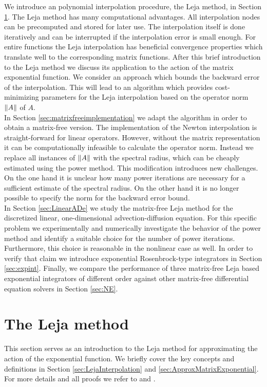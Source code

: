\documentclass{scrartcl}
\begin{document}
	We introduce an polynomial interpolation procedure, the Leja method, in Section \ref{sec:LejaMethod}. The Leja method has many computational advantages. All interpolation nodes can be precomputed and stored for later use. The interpolation itself is done iteratively and can be interrupted if the interpolation error is small enough. For entire functions the Leja interpolation has beneficial convergence properties which translate well to the corresponding matrix functions. After this brief introduction to the Leja method we discuss its application to the action of the matrix exponential function. We consider an approach which bounds the backward error of the interpolation. This will lead to an algorithm which provides cost-minimizing parameters for the Leja interpolation based on the operator norm $\lVert A\rVert$ of $A$. \\
	In Section \ref{sec:matrixfreeimplementation} we adapt the algorithm in order to obtain a matrix-free version. The implementation of the Newton interpolation is straight-forward for linear operators. However, without the matrix representation it can be computationally infeasible to calculate the operator norm. Instead we replace all instances of $\lVert A\rVert$ with the spectral radius, which can be cheaply estimated using the power method. This modification introduces new challenges. On the one hand it is unclear how many power iterations are necessary for a sufficient estimate of the spectral radius. On the other hand it is no longer possible to specify the norm for the backward error bound. \\
	In Section \ref{sec:LinearADe} we study the matrix-free Leja method for the discretized linear, one-dimensional advection-diffusion equation. For this specific problem we experimentally and numerically investigate the behavior of the power method and identify a suitable choice for the number of power iterations. Furthermore, this choice is reasonable in the nonlinear case as well. In order to verify that claim we introduce exponential Rosenbrock-type integrators in Section \ref{sec:expint}. Finally, we compare the performance of three matrix-free Leja based exponential integrators of different order against other matrix-free differential equation solvers in Section \ref{sec:NE}.
	

	\section{The Leja method} \label{sec:LejaMethod}
	This section serves as an introduction to the Leja method for approximating the action of the exponential function. We briefly cover the key concepts and definitions in Section \ref{sec:LejaInterpolation} and \ref{sec:ApproxMatrixExponential}. For more details and all proofs we refer to \cite{advdif} and \cite{lejarev}. 
	
\end{document}
